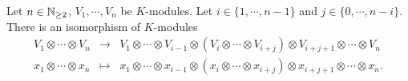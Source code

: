 \begin{propositionenv}
    Let $n\in \mathbb{N}_{\ge 2}$, $V_1, \cdots, V_n$ be $K$-modules. 
    Let $i \in \{1,\cdots, n-1\}$ and $j \in \{0, \cdots, n-i\}$.
    There is an isomorphism of $K$-modules
    \begin{equation*}
        \begin{array}{rcl}
            V_1 \otimes \cdots \otimes V_n & \rightarrow & V_1 \otimes \cdots \otimes V_{i-1} \otimes \left(V_i \otimes \cdots \otimes V_{i+j}\right) \otimes V_{i+j+1} \otimes \cdots \otimes V_n\\
            x_1 \otimes \cdots \otimes x_n & \mapsto & x_1 \otimes \cdots \otimes x_{i-1} \otimes (x_i \otimes \cdots \otimes x_{i+j}) \otimes x_{i+j+1} \otimes \cdots \otimes x_n.
        \end{array}
    \end{equation*}
\end{propositionenv}
